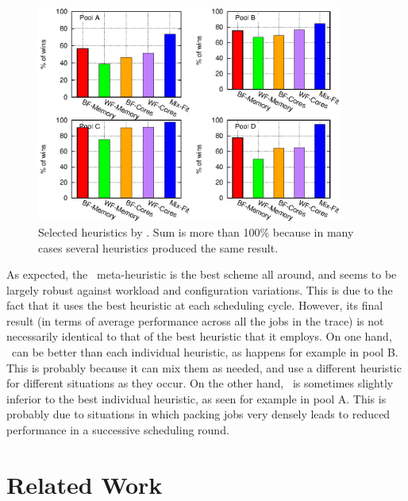 \begin{figure}\centering
	\includegraphics[width=0.9\textwidth]{figures/max-jobs-selected.eps}
\caption{Selected heuristics by \maj.
Sum is more than 100\% because in many cases several heuristics
produced the same result.}
\label{fig:max-jobs-selected}
\end{figure}


As expected, the \maj\ meta-heuristic is the
best scheme all around, and seems to be largely robust against workload and configuration variations.
This is due to the fact that it uses the best heuristic at each
scheduling cycle.
However, its final result (in terms of average performance across all
the jobs in the trace) is not necessarily identical to that of the
best heuristic that it employs.
On one hand, \maj\ can be better than each individual heuristic, as
happens for example in pool B.
This is probably because it can mix them as needed, and use a
different heuristic for different situations as they occur.
On the other hand, \maj\ is sometimes slightly inferior to the best
individual heuristic, as seen for example in pool A.
This is probably due to situations in which packing jobs very densely
leads to reduced performance in a successive scheduling round.


\chapter{Related Work}
\label{sec:related}

